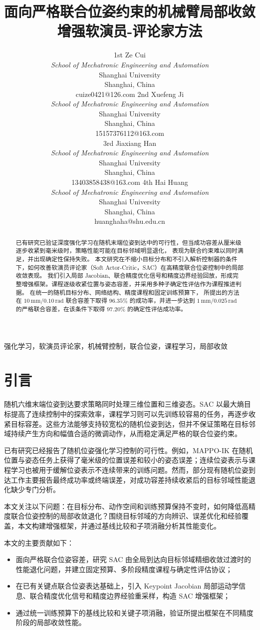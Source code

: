 \documentclass[conference]{IEEEtran}
\title{面向严格联合位姿约束的机械臂局部收敛增强软演员-评论家方法}
\author{%
\begin{tabular}{@{}c@{\hspace{1.0cm}}c@{}}
\parbox{0.43\textwidth}{\centering
1st Ze Cui\\[-1pt]
\textit{School of Mechatronic Engineering and Automation}\\
Shanghai University\\
Shanghai, China\\
cuize0421@126.com}
&
\parbox{0.43\textwidth}{\centering
2nd Xuefeng Ji\\[-1pt]
\textit{School of Mechatronic Engineering and Automation}\\
Shanghai University\\
Shanghai, China\\
15157376112@163.com}\\[1.2em]
\parbox{0.43\textwidth}{\centering
3rd Jiaxiang Han\\[-1pt]
\textit{School of Mechatronic Engineering and Automation}\\
Shanghai University\\
Shanghai, China\\
13403858438@163.com}
&
\parbox{0.43\textwidth}{\centering
4th Hai Huang\\[-1pt]
\textit{School of Mechatronic Engineering and Automation}\\
Shanghai University\\
Shanghai, China\\
huanghaha@shu.edu.cn}
\end{tabular}}
\begin{document}
\maketitle

\begin{abstract}
已有研究已验证深度强化学习在随机末端位姿到达中的可行性，但当成功容差从厘米级逐步收紧到毫米级时，策略性能可能在目标邻域明显退化，
表现为联合约束难以同时满足，并出现确定性保持失败。
本文研究在不缩小目标分布和不引入解析控制器的条件下，如何改善软演员评论家（Soft Actor-Critic，SAC）在高精度联合位姿控制中的局部收敛表现。
我们引入局部 Jacobian、联合精度优化信号和精度边界经验回放，形成完整增强框架。课程逐级收紧位置与姿态容差，并采用多种子确定性评估作为课程推进判据。
在统一的随机目标分布、网络结构、精度课程和固定训练预算下，
所提出的方法在 $10\,\mathrm{mm}/0.10\,\mathrm{rad}$ 联合容差下取得 $96.35\%$ 的成功率，并进一步达到 $1\,\mathrm{mm}/0.025\,\mathrm{rad}$ 的严格联合容差，在该条件下取得 $97.20\%$ 的确定性评估成功率。
\end{abstract}

\begin{IEEEkeywords}
强化学习，软演员评论家，机械臂控制，联合位姿，课程学习，局部收敛
\end{IEEEkeywords}

\section{引言}
随机六维末端位姿到达要求策略同时处理三维位置和三维姿态。SAC 以最大熵目标提高了连续控制中的探索效率\cite{haarnoja2018sac}，课程学习则可以先训练较容易的任务，再逐步收紧目标容差\cite{bengio2009curriculum}。这些方法能够支持较宽松的随机位姿到达，但并不保证策略在目标邻域持续产生方向和幅值合适的微调动作，从而稳定满足严格的联合位姿约束。

已有研究已经报告了随机位姿强化学习控制的可行性。例如，MAPPO-IK 在随机位置与姿态任务上获得了毫米级的位置误差和较小的姿态误差\cite{zhao2024mappoik}；连续位姿表示与课程学习也被用于缓解位姿表示不连续带来的训练问题\cite{hu2025rtpc}。然而，部分现有随机位姿到达工作主要报告最终成功率或终端误差，对成功容差持续收紧后的目标邻域性能退化缺少专门分析。

本文关注以下问题：在目标分布、动作空间和训练预算保持不变时，如何降低高精度联合位姿控制的局部收敛退化？围绕目标邻域的方向辨识、误差优化和经验覆盖，本文构建增强框架，并通过基线比较和子项消融分析其性能变化。

本文的主要贡献如下：
\begin{itemize}
  \item 面向严格联合位姿容差，研究 SAC 由全局到达向目标邻域精细收敛过渡时的性能退化问题，并建立固定预算、多阶段精度课程与确定性评估协议；
  \item 在已有关键点联合位姿表达基础上，引入 Keypoint Jacobian 局部运动学信息、联合精度优化信号和精度边界经验重采样，构造 SAC 增强框架；
  \item 通过统一训练预算下的基线比较和关键子项消融，验证所提出框架在不同精度阶段的局部收敛性能。
\end{itemize}
\end{document}
